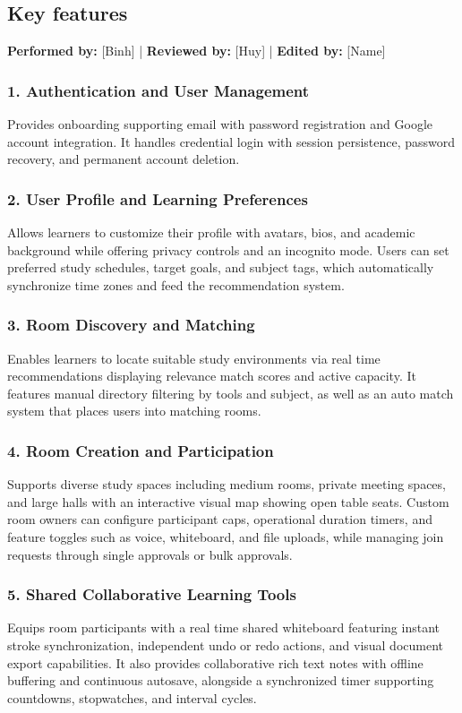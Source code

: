 \documentclass[12pt]{article}
\begin{document}
\subsection{Key features}
\textbf{Performed by:} [Binh] | \textbf{Reviewed by:} [Huy] | \textbf{Edited by:} [Name]

\subsubsection{1. Authentication and User Management}
Provides onboarding supporting email with password registration and Google account integration. It handles credential login with session persistence, password recovery, and permanent account deletion.

\subsubsection{2. User Profile and Learning Preferences}
Allows learners to customize their profile with avatars, bios, and academic background while offering privacy controls and an incognito mode. Users can set preferred study schedules, target goals, and subject tags, which automatically synchronize time zones and feed the recommendation system.

\subsubsection{3. Room Discovery and Matching}
Enables learners to locate suitable study environments via real time recommendations displaying relevance match scores and active capacity. It features manual directory filtering by tools and subject, as well as an auto match system that places users into matching rooms.

\subsubsection{4. Room Creation and Participation}
Supports diverse study spaces including medium rooms, private meeting spaces, and large halls with an interactive visual map showing open table seats. Custom room owners can configure participant caps, operational duration timers, and feature toggles such as voice, whiteboard, and file uploads, while managing join requests through single approvals or bulk approvals.

\subsubsection{5. Shared Collaborative Learning Tools}
Equips room participants with a real time shared whiteboard featuring instant stroke synchronization, independent undo or redo actions, and visual document export capabilities. It also provides collaborative rich text notes with offline buffering and continuous autosave, alongside a synchronized timer supporting countdowns, stopwatches, and interval cycles.
\end{document}
